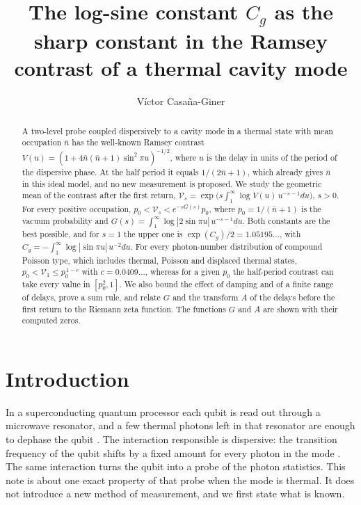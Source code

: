 \documentclass[11pt,reqno]{amsart}
\makeatletter
\let\CG@origcite\cite
\renewcommand*{\cite}[2][]{\def\CG@citekey{#2}%
  \ifx\relax#1\relax\CG@origcite{#2}\else\CG@origcite[#1]{#2}\fi}
\numberwithin{equation}{section}
\theoremstyle{plain}
\theoremstyle{definition}
\theoremstyle{remark}
\makeatother
\begin{document}
\title[The constant $C_g$ and the contrast of a thermal mode]{The log-sine constant $C_g$ as the sharp constant in the Ramsey contrast of a thermal cavity mode}
\author{V\'ictor Casa\~na-Giner}
\date{}

\begin{abstract}
A two-level probe coupled dispersively to a cavity mode in a thermal state with mean occupation $\bar n$ has the well-known Ramsey contrast $V(u)=(1+4\bar n(\bar n+1)\sin^2\pi u)^{-1/2}$, where $u$ is the delay in units of the period of the dispersive phase. At the half period it equals $1/(2\bar n+1)$, which already gives $\bar n$ in this ideal model, and no new measurement is proposed. We study the geometric mean of the contrast after the first return, $\mathcal V_s=\exp\big(s\int_1^\infty\log V(u)\,u^{-s-1}du\big)$, $s>0$. For every positive occupation, $p_0<\mathcal V_s<e^{-sG(s)}p_0$, where $p_0=1/(\bar n+1)$ is the vacuum probability and $G(s)=\int_1^\infty\log|2\sin\pi u|\,u^{-s-1}du$. Both constants are the best possible, and for $s=1$ the upper one is $\exp(C_g)/2=1.05195\ldots$, with $C_g=-\int_1^\infty\log|\sin\pi u|\,u^{-2}du$. For every photon-number distribution of compound Poisson type, which includes thermal, Poisson and displaced thermal states, $p_0<\mathcal V_1\le p_0^{\,1-c}$ with $c=0.0409\ldots$, whereas for a given $p_0$ the half-period contrast can take every value in $[p_0^2,1]$. We also bound the effect of damping and of a finite range of delays, prove a sum rule, and relate $G$ and the transform $A$ of the delays before the first return to the Riemann zeta function. The functions $G$ and $A$ are shown with their computed zeros.
\end{abstract}


\maketitle
\tableofcontents

\section{Introduction}\label{sec:intro}

In a superconducting quantum processor each qubit is read out through a microwave resonator, and a few thermal photons left in that resonator are enough to dephase the qubit \cite{Rigetti2012,Sears2012}. The interaction responsible is dispersive: the transition frequency of the qubit shifts by a fixed amount for every photon in the mode \cite{Blais2021}. The same interaction turns the qubit into a probe of the photon statistics. This note is about one exact property of that probe when the mode is thermal. It does not introduce a new method of measurement, and we first state what is known.
\end{document}
